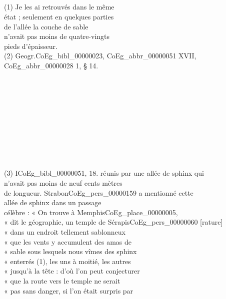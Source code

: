 \documentclass{book}
\begin{document}
{\begin{paracol}{2}
\noindent \\
\\
\\
\\
\\
\\
\\
\\
\\
(1) Je les ai retrouvés dans le même\\
état ; seulement en quelques parties\\
de l’allée la couche de sable\\
n’avait pas moins de quatre-vingts\\
pieds d’épaisseur.\\
(2) Geogr.\gls{CoEg_bibl_00000023}, \gls{CoEg_abbr_00000051} XVII, \gls{CoEg_abbr_00000028} 1, § 14.\\
\\
\\
\\
\\
\\
\\
\\
\\
\\
\\
(3) I\gls{CoEg_bibl_00000051}, 18.
\switchcolumn
\noindent réunis par une allée de sphinx qui\\
n’avait pas moins de neuf cents mètres\\
de longueur. Strabon\gls{CoEg_pers_00000159} a mentionné cette\\
allée de sphinx dans un passage\\
célèbre : « On trouve à Memphis\gls{CoEg_place_00000005},\\
« dit le géographie, un temple de Sérapis\gls{CoEg_pers_00000060} [rature]\\
« dans un endroit tellement sablonneux\\
« que les vents y accumulent des amas de\\
« sable sous lesquels nous vîmes des sphinx\\
« enterrés (1), les uns à moitié, les autres\\
« jusqu’à la tête : d’où l’on peut conjecturer\\
« que la route vers le temple ne serait\\
« pas sans danger, si l’on était surpris par\\

\end{paracol}}
\end{document}
